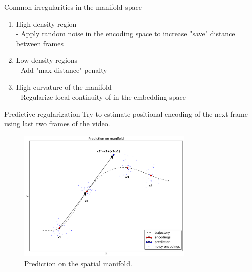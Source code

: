 \documentclass[pdftex, handout]{beamer}
\begin{document}
\begin{frame}[noframenumbering]{Common irregularities in the manifold space}
  \begin{enumerate}
  \item High density region \\
    - Apply random noise in the encoding space to increase "save" distance between frames
  \item Low density regions \\
    - Add "max-distance" penalty
  \item High curvature of the manifold \\
    - Regularize local continuity of in the embedding space
  \end{enumerate}
\end{frame}


\begin{frame}{Predictive regularization}
  Try to estimate positional encoding of the next frame using last two frames of the video.
  \begin{figure}
    \includegraphics[width=0.75\textwidth,height=0.75\textheight,keepaspectratio]{images_main/prediction.png}
    \caption{Prediction on the spatial manifold.}
  \end{figure}
\end{frame}

\end{document}
